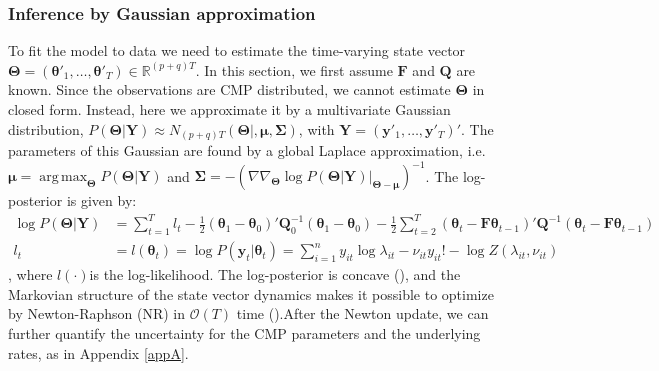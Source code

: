 \documentclass[]{article}
\DeclareMathOperator*{\argmax}{arg\,max}
\begin{document}
	\subsubsection{Inference by Gaussian approximation}
	To fit the model to data we need to estimate the time-varying state vector $\bm{\Theta} = (\bm{\theta}'_1,\ldots,\bm{\theta}'_T)\in\mathbb{R}^{(p+q)T}$. In this section, we first assume $\bm{F}$ and $\bm{Q}$ are known. Since the observations are CMP distributed, we cannot estimate $\bm{\Theta}$ in closed form. Instead, here we approximate it by a multivariate Gaussian distribution, $P(\bm{\Theta|Y}) \approx N_{(p+q)T}(\bm{\Theta|,\mu,\Sigma})$, with $\bm{Y} = (\bm{y}'_1,\ldots, \bm{y}'_T)'$. The parameters of this Gaussian are found by a global Laplace approximation, i.e. $\bm{\mu} = \argmax_{\bm{\Theta}}P(\bm{\Theta|Y})$ and $\bm{\Sigma} = -(\nabla\nabla_{\bm{\Theta}}\log P(\bm{\Theta|Y})|_{\bm{\Theta - \mu}})^{-1}$. The log-posterior is given by:
	\begin{align}
		\log P(\bm{\Theta|Y}) &= \sum_{t=1}^{T}l_t - \frac{1}{2}(\bm{\theta}_1 - \bm{\theta}_0)'\bm{Q}_0^{-1}(\bm{\theta}_1 - \bm{\theta}_0) - \frac{1}{2}\sum_{t=2}^{T}(\bm{\theta}_t - \bm{F\theta}_{t-1})'\bm{Q}^{-1}(\bm{\theta}_t - \bm{F\theta}_{t-1})\\
		l_t &= l(\bm{\theta}_t) = \log P(\bm{y}_t|\bm{\theta}_t) = \sum_{i=1}^{n}y_{it}\log \lambda_{it} - \nu_{it}y_{it}! - \log Z(\lambda_{it}, \nu_{it}) \nonumber
	\end{align}
	, where $l(\cdot)$is the log-likelihood. The log-posterior is concave (\cite{Gupta2014}), and the Markovian structure of the state vector dynamics makes it possible to optimize by Newton-Raphson (NR) in $\mathcal{O}(T)$ time (\cite{Paninski2010}).After the Newton update, we can further quantify the uncertainty for the CMP parameters and the underlying rates, as in Appendix \ref{appA}.
	
\end{document}
